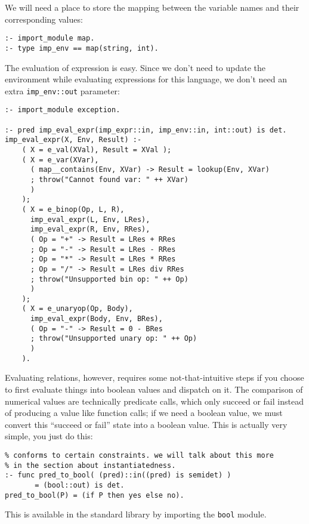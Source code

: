 We will need a place to store the mapping between the variable names and their corresponding values:

\begin{lstlisting}[language=Mercury]
:- import_module map.
:- type imp_env == map(string, int).
\end{lstlisting}

The evaluation of expression is easy. Since we don't need to update the environment while evaluating expressions for this language, we don't need an extra \texttt{imp_env::out} parameter:

\begin{lstlisting}[language=Mercury]
% needed by `throw`
:- import_module exception.

:- pred imp_eval_expr(imp_expr::in, imp_env::in, int::out) is det.
imp_eval_expr(X, Env, Result) :-
	( X = e_val(XVal), Result = XVal );
	( X = e_var(XVar),
	  ( map__contains(Env, XVar) -> Result = lookup(Env, XVar)
	  ; throw("Cannot found var: " ++ XVar)
	  )
	);
	( X = e_binop(Op, L, R),
	  imp_eval_expr(L, Env, LRes),
	  imp_eval_expr(R, Env, RRes),
	  ( Op = "+" -> Result = LRes + RRes
	  ; Op = "-" -> Result = LRes - RRes
	  ; Op = "*" -> Result = LRes * RRes
	  ; Op = "/" -> Result = LRes div RRes
	  ; throw("Unsupported bin op: " ++ Op)
	  )
	);
	( X = e_unaryop(Op, Body),
	  imp_eval_expr(Body, Env, BRes),
	  ( Op = "-" -> Result = 0 - BRes
	  ; throw("Unsupported unary op: " ++ Op)
	  )
	).
\end{lstlisting}

Evaluating relations, however, requires some not-that-intuitive steps if you choose to first evaluate things into boolean values and dispatch on it. The comparison of numerical values are technically predicate calls, which only succeed or fail instead of producing a value like function calls; if we need a boolean value, we must convert this ``succeed or fail'' state into a boolean value. This is actually very simple, you just do this:

\begin{lstlisting}[language=Mercury]
% the instantiatedness here restricts its argument to those that
% conforms to certain constraints. we will talk about this more
% in the section about instantiatedness.
:- func pred_to_bool( (pred)::in((pred) is semidet) )
       = (bool::out) is det.
pred_to_bool(P) = (if P then yes else no).
\end{lstlisting}

This is available in the standard library by importing the \texttt{bool} module.

